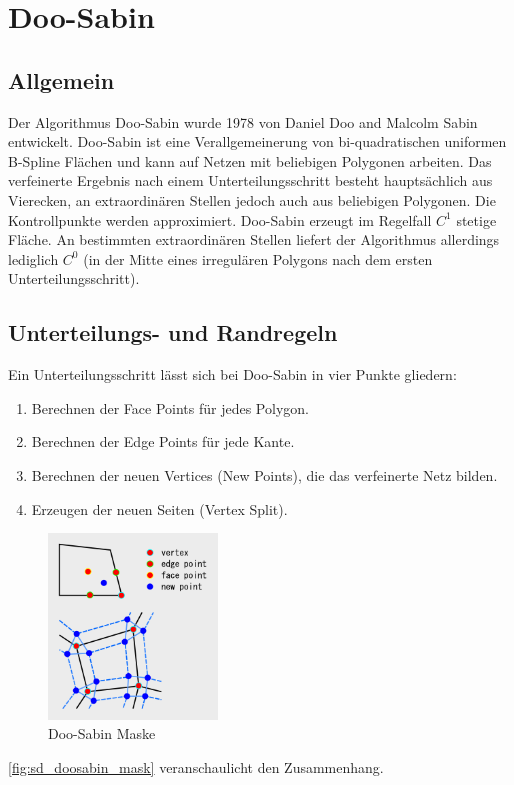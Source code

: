 \section{Doo-Sabin} \label{sec:doosabin}

\subsection{Allgemein}

Der Algorithmus Doo-Sabin wurde 1978 von Daniel Doo and Malcolm Sabin entwickelt.
Doo-Sabin ist eine Verallgemeinerung von bi-quadratischen uniformen B-Spline Flächen
und kann auf Netzen mit beliebigen Polygonen arbeiten.
Das verfeinerte Ergebnis nach einem Unterteilungsschritt besteht hauptsächlich
aus Vierecken, an extraordinären Stellen jedoch auch aus beliebigen Polygonen.
Die Kontrollpunkte werden approximiert.
Doo-Sabin erzeugt im Regelfall \(C^1\) stetige Fläche.
An bestimmten extraordinären Stellen liefert der Algorithmus allerdings lediglich \(C^0\)
(in der Mitte eines irregulären Polygons nach dem ersten Unterteilungsschritt).
\cite[S. 60]{Standford.24.07.2015} \cite[S. 79f]{Zorin.subdivcourse}

\subsection{Unterteilungs- und Randregeln}

Ein Unterteilungsschritt lässt sich bei Doo-Sabin in vier Punkte gliedern:
\begin{enumerate}
\item Berechnen der Face Points für jedes Polygon.
\item Berechnen der Edge Points für jede Kante.
\item Berechnen der neuen Vertices (New Points), die das verfeinerte Netz bilden.
\item Erzeugen der neuen Seiten (Vertex Split).
\end{enumerate}

\begin{figure}
\centering
\includegraphics[width=0.4\textwidth]{content/media/sd_doosabin_mask.png}
\caption{Doo-Sabin Maske \cite{Yoshihitoyagi.doosabin}}
\label{fig:sd_doosabin_mask}
\end{figure}
\autoref{fig:sd_doosabin_mask} veranschaulicht den Zusammenhang.

